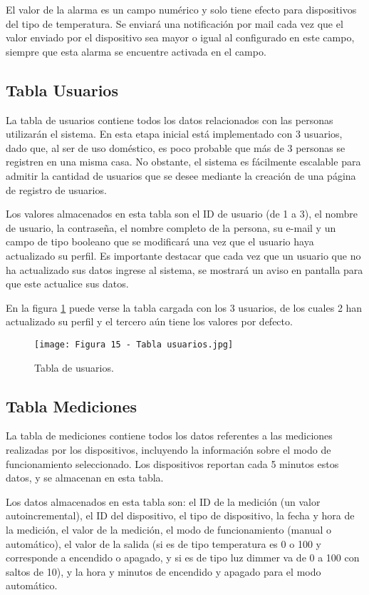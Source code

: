 El valor de la alarma es un campo numérico y solo tiene efecto para dispositivos del tipo de temperatura. Se enviará una notificación por mail cada vez que el valor enviado por el dispositivo sea mayor o igual al configurado en este campo, siempre que esta alarma se encuentre activada en el campo.

\subsection{Tabla Usuarios}

La tabla de usuarios contiene todos los datos relacionados con las personas utilizarán el sistema. En esta etapa inicial está implementado con 3 usuarios, dado que, al ser de uso doméstico, es poco probable que más de 3 personas se registren en una misma casa. No obstante, el sistema es fácilmente escalable para admitir la cantidad de usuarios que se desee mediante la creación de una página de registro de usuarios.

Los valores almacenados en esta tabla son el ID de usuario (de 1 a 3), el nombre de usuario, la contraseña, el nombre completo de la persona, su e-mail y un campo de tipo booleano que se modificará una vez que el usuario haya actualizado su perfil. Es importante destacar que cada vez que un usuario que no ha actualizado sus datos ingrese al sistema, se mostrará un aviso en pantalla para que este actualice sus datos.

En la figura \ref{fig:15} puede verse la tabla cargada con los 3 usuarios, de los cuales 2 han actualizado su perfil y el tercero aún tiene los valores por defecto.

\begin{figure}[h]
\centering
\texttt{[image: Figura 15 - Tabla usuarios.jpg]}
\caption[Tabla usuarios]{Tabla de usuarios. \footnotemark}
\label{fig:15}
\end{figure}

\subsection{Tabla Mediciones}

La tabla de mediciones contiene todos los datos referentes a las mediciones realizadas por los dispositivos, incluyendo la información sobre el modo de funcionamiento seleccionado. Los dispositivos reportan cada 5 minutos estos datos, y se almacenan en esta tabla.

Los datos almacenados en esta tabla son: el ID de la medición (un valor autoincremental), el ID del dispositivo, el tipo de dispositivo, la fecha y hora de la medición, el valor de la medición, el modo de funcionamiento (manual o automático), el valor de la salida (si es de tipo temperatura es 0 o 100 y corresponde a encendido o apagado, y si es de tipo luz dimmer va de 0 a 100 con saltos de 10), y la hora y minutos de encendido y apagado para el modo automático.

